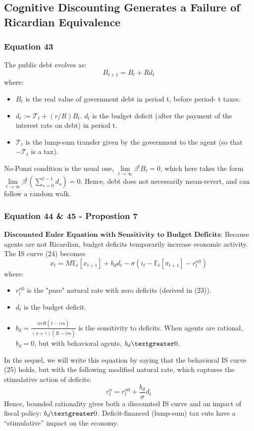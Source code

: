 \documentclass{article}
\begin{document}
\subsection{Cognitive Discounting Generates a Failure of Ricardian Equivalence}

\subsubsection*{Equation 43}
The public debt evolves as:
\begin{equation}\tag{43}
    B_{t+1}=B_{t}+R d_{t}
\end{equation}
where:
\begin{itemize}
    \item $B_{t}$ is the real value of government debt in period t, before period- t taxes.
    \item $d_{t}:=\mathcal{T}_{t}+(r/R)B_{t}$. $d_{t}$ is the budget deficit (after the payment of the interest rate on debt) in period t.
    \item $\mathcal{T}_{t}$ is the lump-sum transfer given by the government to the agent (so that $-\mathcal{T}_{t}$ is a tax).
\end{itemize}
No-Ponzi condition is the usual one, $\lim\limits_{t\to\infty}\beta^{t}B_{t}=0$, which here takes the form $\lim\limits_{t\to\infty}\beta^{t}\left(\sum_{s=0}^{t-1}d_{s}\right)=0$. Hence, debt does not necessarily mean-revert, and can follow a random walk.

\subsubsection*{Equation 44 \& 45 - Propostion 7}
$\textbf{Discounted Euler Equation with Sensitivity to Budget Deficits}$: Because agents are not Ricardian, budget deficits temporarily increase economic activity.
The IS curve (24) becomes
\begin{equation}\tag{44}
    x_{t}=M\mathbb{E}_{t}\left[x_{t+1}\right]+b_{d}d_{t}-\sigma\left(i_{t}-\mathbb{E}_{t}\left[\pi_{t+1}\right]-r_{t}^{n0}\right)
\end{equation}
where:
\begin{itemize}
    \item $r_{t}^{n0}$ is the "pure" natural rate with zero deficits (derived in (23)).
    \item $d_{t}$ is the budget deficit.
    \item $b_{d}=\frac{\phi rR(1-\overline(m)}{(\phi+\gamma)(R-\overline(m)}$ is the sensitivity to deficits. When agents are rational, $b_{d}=0$, but with behavioral agents, $b_{d}\textgreater0$.
\end{itemize}
In the sequel, we will write this equation by saying that the behavioral IS curve (25) holds, but with the following modified natural rate, which captures the stimulative action of deficits:
\begin{equation}\tag{45}
    r_{t}^{n}=r_{t}^{n0}+\frac{b_{d}}{\sigma}d_{t}
\end{equation}
Hence, bounded rationality gives both a discounted IS curve and an impact of fiscal policy: $b_{d} \textgreater 0$. Deficit-financed (lump-sum) tax cuts have a “stimulative” impact on the economy.
\end{document}

